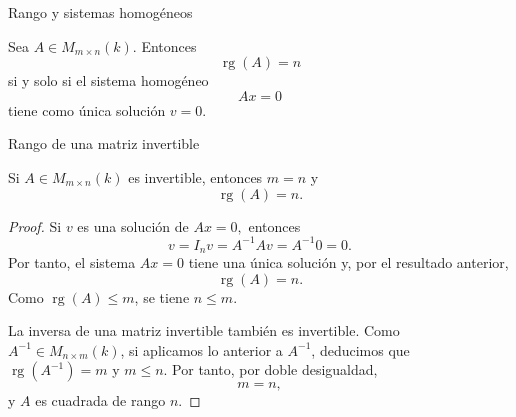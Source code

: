 \begin{frame}{Rango y sistemas homogéneos}

\begin{corollary}
Sea \(A\in M_{m\times n}(k)\). Entonces
\[
\operatorname{rg}(A)=n
\]
si y solo si el sistema homogéneo
\[
Ax=0
\]
tiene como única solución \(v=0\).
\end{corollary}

\end{frame}

\begin{frame}[allowframebreaks, t]{Rango de una matriz invertible}

\begin{proposition}
Si \(A\in M_{m\times n}(k)\) es invertible, entonces \(m=n\) y
\[
\operatorname{rg}(A)=n.
\]
\end{proposition}

\vspace{-5mm}

\begin{proof}
Si \(v\) es una solución de
\(
Ax=0,
\)
entonces
\[
v=I_nv=A^{-1}Av=A^{-1}0=0.
\]
Por tanto, el sistema \(Ax=0\) tiene una única solución y, por el
resultado anterior,
\[
\operatorname{rg}(A)=n.
\]
Como \(\operatorname{rg}(A)\leq m\), se tiene \(n\leq m\).

La inversa de una matriz invertible también es invertible. Como $A^{-1}\in M_{n\times m}(k)$, si aplicamos lo anterior a $A^{-1}$, deducimos que $\operatorname{rg}(A^{-1})=m$ y \(m\leq n\).
Por tanto, por doble desigualdad,
\[
m=n,
\]
y \(A\) es cuadrada de rango \(n\).
\end{proof}

\end{frame}

